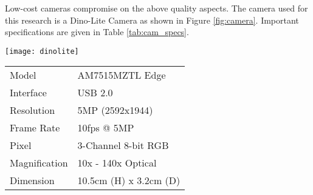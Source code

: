 Low-cost cameras compromise on the above quality aspects. The camera used for this research is a Dino-Lite Camera as shown in Figure \ref{fig:camera}. Important specifications are given in Table \ref{tab:cam_specs}. 

{\centering \vspace*{\baselineskip}
\begin{minipage}{0.45\textwidth}
   \centering
   \texttt{[image: dinolite]} 
   \label{fig:camera}
\end{minipage}
\begin{minipage}{0.58\textwidth}
   \centering
    \begin{tabular}{ll}\hline \hline
		Model & AM7515MZTL Edge  \\
		Interface & USB 2.0 \\
		Resolution & 5MP (2592x1944) \\
		Frame Rate & 10fps @ 5MP \\
		Pixel & 3-Channel 8-bit RGB \\
		Magnification & 10x - 140x Optical \\
		Dimension & 10.5cm (H) x 3.2cm (D) \\ \hline
	\end{tabular}
	\label{tab:cam_specs}
\end{minipage}
}

